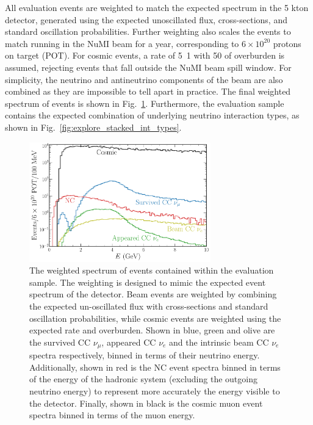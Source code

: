 All evaluation events are weighted to match the expected spectrum in the 5 kton \chipsfive
detector, generated using the expected unoscillated flux, cross-sections, and standard oscillation
probabilities. Further weighting also scales the events to match running in the NuMI beam for a
year, corresponding to $6\times 10^{20}$ protons on target (POT). For cosmic events, a rate of
\unit{5.1}{} with \unit{50}{} of overburden is assumed, rejecting events
that fall outside the NuMI beam spill window. For simplicity, the neutrino and antineutrino
components of the beam are also combined as they are impossible to tell apart in practice. The
final weighted spectrum of events is shown in Fig.~\ref{fig:explore_osc_fluxes}. Furthermore, the
evaluation sample contains the expected combination of underlying neutrino interaction types, as
shown in Fig.~\ref{fig:explore_stacked_int_types}.

\begin{figure} %
    \includegraphics[width=0.7\textwidth]{diagrams/6-cvn/chipsnet/explore_osc_fluxes.pdf}
    \caption[Weighted spectrum of evaluation sample events.]
    {The weighted spectrum of events contained within the evaluation sample. The weighting is
        designed to mimic the expected event spectrum of the \chipsfive detector. Beam events are
        weighted by combining the expected un-oscillated flux with cross-sections and standard
        oscillation probabilities, while cosmic events are weighted using the expected rate and
        overburden. Shown in blue, green and olive are the survived CC $\nu_{\mu}$, appeared CC
        $\nu_{e}$ and the intrinsic beam CC $\nu_{e}$ spectra respectively, binned in terms of
        their neutrino energy. Additionally, shown in red is the NC event spectra binned in terms
        of the energy of the hadronic system (excluding the outgoing neutrino energy) to represent
        more accurately the energy visible to the detector. Finally, shown in black is the cosmic
        muon event spectra binned in terms of the muon energy.}
    \label{fig:explore_osc_fluxes}
\end{figure}

